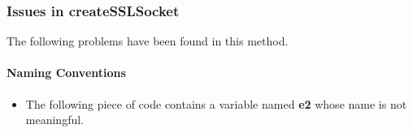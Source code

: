 
\subsubsection{Issues in createSSLSocket}
The following problems have been found in this method.

\paragraph{Naming Conventions}
\begin{itemize}
		\begin{itemize}
			\item
				The following piece of code contains a variable named \textbf{e2} whose name is not meaningful.
		\end{itemize}
\end{itemize}

